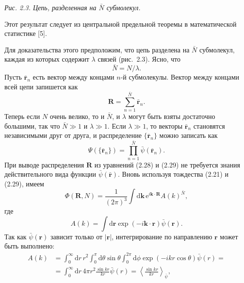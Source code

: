\documentclass[12pt,a4paper]{article}
\begin{document}
\begin{center}
\textit{Рис. 2.3. Цепь, разделенная на $\bar{N}$ субмолекул.}
\end{center}

Этот результат следует из центральной предельной теоремы в математической статистике [5].

Для доказательства этого предположим, что цепь разделена на $\bar{N}$ субмолекул, каждая из которых содержит $\lambda$ связей (рис.~2.3). Ясно, что
\begin{equation}
\bar{N} = N/\lambda. \tag{2.27}
\end{equation}
Пусть $\bar{\boldsymbol{r}}_n$ есть вектор между концами $n$-й субмолекулы. Вектор между концами всей цепи запишется как
\begin{equation}
\boldsymbol{R} = \sum_{n=1}^{\bar{N}}\bar{\boldsymbol{r}}_n. \tag{2.28}
\end{equation}
Теперь если $N$ очень велико, то и $\bar{N}$, и $\lambda$ могут быть взяты достаточно большими, так что $\bar{N} \gg 1$ и $\lambda \gg 1$. Если $\lambda \gg 1$, то векторы $\bar{\boldsymbol{r}}_n$ становятся независимыми друг от друга, и распределение $\{\bar{\boldsymbol{r}}_n\}$ можно записать как
\begin{equation}
\Psi(\{\bar{\boldsymbol{r}}_n\}) = \prod_{n=1}^{\bar{N}}\bar{\psi}(\bar{\boldsymbol{r}}_n). \tag{2.29}
\end{equation}
При выводе распределения $\boldsymbol{R}$ из уравнений (2.28) и (2.29) не требуется знания действительного вида функции $\bar{\psi}(\bar{\boldsymbol{r}})$. Вновь используя тождества (2.21) и (2.29), имеем
\begin{equation}
\Phi(\boldsymbol{R}, N) = \frac{1}{(2\pi)^3}\int\!\mathrm{d}\boldsymbol{k}\,\mathrm{e}^{i\boldsymbol{k}\cdot\boldsymbol{R}}A(k)^{\bar{N}}, \tag{2.30}
\end{equation}
где
\begin{equation}
A(k) = \int\!\mathrm{d}\boldsymbol{r}\exp(-i\boldsymbol{k}\cdot\boldsymbol{r})\bar{\psi}(\boldsymbol{r}). \tag{2.31}
\end{equation}
Так как $\bar{\psi}(\boldsymbol{r})$ зависит только от $|\boldsymbol{r}|$, интегрирование по направлению $\boldsymbol{r}$ может быть выполнено:
\begin{align}
A(k) &= \int_0^\infty\!\mathrm{d}r\,r^2\int_0^\pi\!\mathrm{d}\theta\sin\theta\int_0^{2\pi}\!\mathrm{d}\phi\exp(-ikr\cos\theta)\bar{\psi}(r) = \nonumber\\
&= \int_0^\infty\!\mathrm{d}r\,4\pi r^2\frac{\sin kr}{kr}\bar{\psi}(r) = \left\langle\frac{\sin kr}{kr}\right\rangle_{\!\bar{\psi}}, \tag{2.32}
\end{align}
\end{document}
